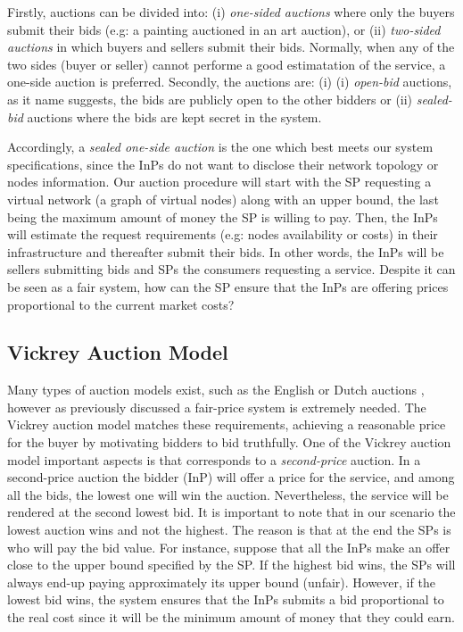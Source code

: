 Firstly, auctions can be divided into: (i) \textit{one-sided auctions} where only the buyers submit their bids (e.g: a painting auctioned in an art auction), or (ii) \textit{two-sided auctions} in which buyers and sellers submit their bids. Normally, when any of the two sides (buyer or seller) cannot performe a good estimatation of the service, a one-side auction is preferred. Secondly, the auctions are: (i) (i) \textit{open-bid} auctions, as it name suggests, the bids are publicly open to the other bidders or (ii) \textit{sealed-bid} auctions where the bids are kept secret in the system.

Accordingly, a \textit{sealed one-side auction} is the one which best meets our system specifications, since the InPs do not want to disclose their network topology or nodes information. Our auction procedure will start with the SP requesting a virtual network (a graph of virtual nodes) along with an upper bound, the last being the maximum amount of money the SP is willing to pay. Then, the InPs will estimate the request requirements (e.g: nodes availability or costs) in their infrastructure and thereafter submit their bids. In other words, the InPs will be sellers submitting bids and SPs the consumers requesting a service. Despite it can be seen as a fair system, how can the SP ensure that the InPs are offering prices proportional to the current market costs?

\subsection{Vickrey Auction Model}

Many types of auction models exist, such as the English or Dutch auctions \cite{coppinger1980incentives}, however as previously discussed a fair-price system is extremely needed. The Vickrey auction model matches these requirements, achieving a reasonable price for the buyer by motivating bidders to bid truthfully. One of the Vickrey auction model important aspects is that corresponds to a \textit{second-price} auction. In a second-price auction the bidder (InP) will offer a price for the service, and among all the bids, the lowest one will win the auction. Nevertheless, the service will be rendered at the second lowest bid. It is important to note that in our scenario the lowest auction wins and not the highest. The reason is that at the end the SPs is who will pay the bid value. For instance, suppose that all the InPs make an offer close to the upper bound specified by the SP. If the highest bid wins, the SPs will always end-up paying approximately its upper bound (unfair). However, if the lowest bid wins, the system ensures that the InPs submits a bid proportional to the real cost since it will be the minimum amount of money that they could earn.

